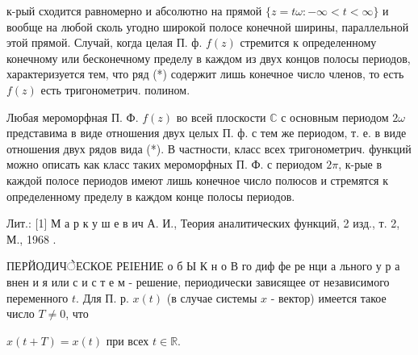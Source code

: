 \documentclass[10pt]{article}
\begin{document}
к-рый сходится равномерно и абсолютно на прямой $\{z=t \omega:-\infty<t<\infty\}$ и вообще на любой сколь угодно широкой полосе конечной ширины, параллельной этой прямой. Случай, когда целая П. ф. $f(z)$ стремится к определенному конечному или бесконечному пределу в каждом из двух концов полосы периодов, характеризуется тем, что ряд (*) содержит лишь конечное число членов, то есть $f(z)$ есть тригонометрич. полином.



Любая мероморфная П. Ф. $f(z)$ во всей плоскости $\mathbb{C}$ с основным периодом $2 \omega$ представима в виде отношения двух целых П. ф. с тем же периодом, т. е. в виде отношения двух рядов вида (*). В частности, класс всех тригонометрич. функций можно описать как класс таких мероморфных П. Ф. с периодом $2 \pi$, к-рые в каждой полосе периодов имеют лишь конечное число полюсов и стремятся к определенному пределу в каждом конце полосы периодов.



Лит.: [1] М а р к у ш е в ич А. И., Теория аналитических функций, 2 изд., т. 2, М., 1968 .



ПЕРЙОДИЧेЕСКОЕ РЕIЕНИЕ о б Ы К н о В го диф фе ре нци а льного у р а внен и я или с и с т е м - решение, периодически зависящее от независимого переменного $t$. Для П. р. $x(t)$ (в случае системы $x$ - вектор) имеется такое число $T \neq 0$, что



$x(t+T)=x(t)$ при всех $t \in \mathbb{R}$.
\end{document}
